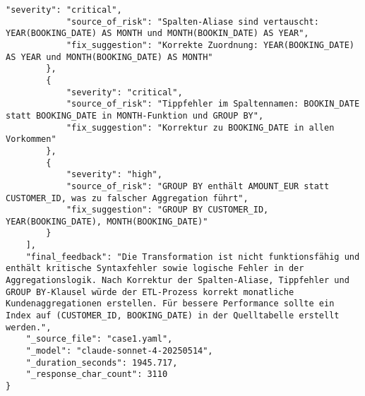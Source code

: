 \begin{lstlisting}[caption={Ausgabe: Claude Sonnet 4 Anwendungsfall 1 Robustheitsdurchlauf},label={claude_case1_prompt3}]
            "severity": "critical",
            "source_of_risk": "Spalten-Aliase sind vertauscht: YEAR(BOOKING_DATE) AS MONTH und MONTH(BOOKIN_DATE) AS YEAR",
            "fix_suggestion": "Korrekte Zuordnung: YEAR(BOOKING_DATE) AS YEAR und MONTH(BOOKING_DATE) AS MONTH"
        },
        {
            "severity": "critical",
            "source_of_risk": "Tippfehler im Spaltennamen: BOOKIN_DATE statt BOOKING_DATE in MONTH-Funktion und GROUP BY",
            "fix_suggestion": "Korrektur zu BOOKING_DATE in allen Vorkommen"
        },
        {
            "severity": "high",
            "source_of_risk": "GROUP BY enthält AMOUNT_EUR statt CUSTOMER_ID, was zu falscher Aggregation führt",
            "fix_suggestion": "GROUP BY CUSTOMER_ID, YEAR(BOOKING_DATE), MONTH(BOOKING_DATE)"
        }
    ],
    "final_feedback": "Die Transformation ist nicht funktionsfähig und enthält kritische Syntaxfehler sowie logische Fehler in der Aggregationslogik. Nach Korrektur der Spalten-Aliase, Tippfehler und GROUP BY-Klausel würde der ETL-Prozess korrekt monatliche Kundenaggregationen erstellen. Für bessere Performance sollte ein Index auf (CUSTOMER_ID, BOOKING_DATE) in der Quelltabelle erstellt werden.",
    "_source_file": "case1.yaml",
    "_model": "claude-sonnet-4-20250514",
    "_duration_seconds": 1945.717,
    "_response_char_count": 3110
}
\end{lstlisting}

